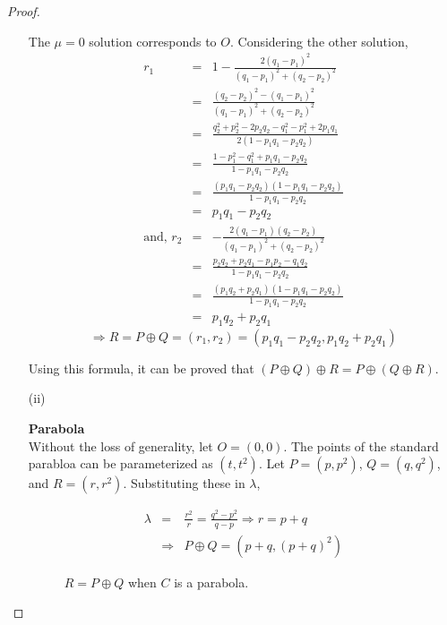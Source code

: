 \begin{proof}
\begin{itemize}
{        The $\mu=0$ solution corresponds to $O$. Considering the other solution,
        \begin{eqnarray*}
          r_1&=&1-\frac{2(q_1-p_1)^2}{(q_1-p_1)^2+(q_2-p_2)^2}\\
             &=&\frac{(q_2-p_2)^2-(q_1-p_1)^2}{(q_1-p_1)^2+(q_2-p_2)^2}\\
             &=&\frac{q_2^2+p_2^2-2p_2q_2-q_1^2-p_1^2+2p_1q_1}{2(1-p_1q_1-p_2q_2)}\\
             &=&\frac{1-p_1^2-q_1^2+p_1q_1-p_2q_2}{1-p_1q_1-p_2q_2}\\
             &=&\frac{(p_1q_1-p_2q_2)(1-p_1q_1-p_2q_2)}{1-p_1q_1-p_2q_2}\\
             &=&p_1q_1-p_2q_2\\
          \text{and, }
          r_2&=&-\frac{2(q_1-p_1)(q_2-p_2)}{(q_1-p_1)^2+(q_2-p_2)^2}\\
             &=&\frac{p_2q_2+p_2q_1-p_1p_2-q_1q_2}{1-p_1q_1-p_2q_2}\\
             &=&\frac{(p_1q_2+p_2q_1)(1-p_1q_1-p_2q_2)}{1-p_1q_1-p_2q_2}\\
             &=&p_1q_2+p_2q_1
        \end{eqnarray*}
        $$\Rightarrow R=P\oplus Q=(r_1,r_2)=(p_1q_1-p_2q_2,p_1q_2+p_2q_1)$$

        Using this formula, it can be proved that $(P\oplus Q)\oplus R=P\oplus(Q\oplus R)$.
      }

    \item[(ii)]{\textbf{Parabola}\\
      Without the loss of generality, let $O=(0,0)$. The points of the standard parabloa can be parameterized as
      $(t,t^2)$. Let $P=(p,p^2)$, $Q=(q,q^2)$, and $R=(r,r^2)$. Substituting these in $\lambda$,

      \begin{eqnarray*}
        \lambda&=&\frac{r^2}{r}=\frac{q^2-p^2}{q-p} \Rightarrow r=p+q \\
        &\Rightarrow&P\oplus Q=(p+q,(p+q)^2)
      \end{eqnarray*}

      \begin{figure}[H]
        \center
        \caption{$R = P \oplus Q$ when $C$ is a parabola.}
      \end{figure}

}
\end{itemize}
\end{proof}
